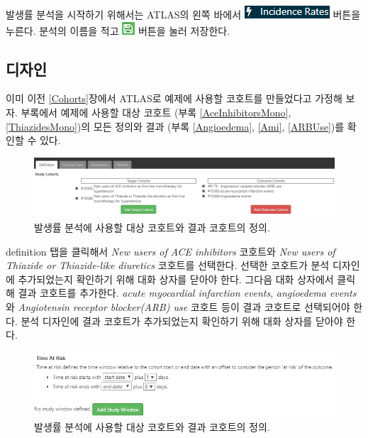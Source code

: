 \documentclass[10.5pt]{book}
\theoremstyle{definition}
\theoremstyle{definition}
\theoremstyle{definition}
\theoremstyle{remark}
\begin{document}
발생률 분석을 시작하기 위해서는 ATLAS의 왼쪽 바에서
\includegraphics{images/Characterization/atlasIncidenceMenuItem.png}
버튼을 누른다. 분석의 이름을 적고
\includegraphics{images/PopulationLevelEstimation/save.png} 버튼을 눌러
저장한다.

\subsection{디자인}\label{-1}

이미 이전 \ref{Cohorts}장에서 ATLAS로 예제에 사용할 코호트를 만들었다고
가정해 보자. 부록에서 예제에 사용할 대상 코호트 (부록
\ref{AceInhibitorsMono}, \ref{ThiazidesMono})의 모든 정의와 결과 (부록
\ref{Angioedema}, \ref{Ami}, \ref{ARBUse})를 확인할 수 있다.

\begin{figure}

{\centering \includegraphics[width=1\linewidth]{images/Characterization/atlasIncidenceCohortSelection} 

}

\caption{발생률 분석에 사용할 대상 코호트와 결과 코호트의 정의.}\label{fig:atlasIncidenceCohortSelection}
\end{figure}

definition 탭을 클릭해서 \emph{New users of ACE inhibitors} 코호트와
\emph{New users of Thiazide or Thiazide-like diuretics} 코호트를
선택한다. 선택한 코호트가 분석 디자인에 추가되었는지 확인하기 위해 대화
상자를 닫아야 한다. 그다음 대화 상자에서 클릭해 결과 코호트를 추가한다.
\emph{acute myocardial infarction events}, \emph{angioedema events}와
\emph{Angiotensin receptor blocker(ARB) use} 코호트 등이 결과 코호트로
선택되어야 한다. 분석 디자인에 결과 코호트가 추가되었는지 확인하기 위해
대화 상자를 닫아야 한다.

\begin{figure}

{\centering \includegraphics[width=1\linewidth]{images/Characterization/atlasIncidenceTimeAtRisk} 

}

\caption{발생률 분석에 사용할 대상 코호트와 결과 코호트의 정의.}\label{fig:atlasIncidenceTimeAtRisk}
\end{figure}
\end{document}
